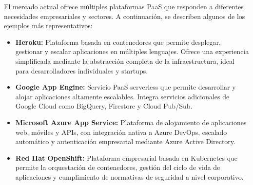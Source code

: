 {            El mercado actual ofrece múltiples plataformas PaaS que responden a diferentes necesidades empresariales y sectores. A continuación, se describen algunos de los ejemplos más representativos:
            
            \begin{itemize}
                \item \textbf{Heroku:} Plataforma basada en contenedores que permite desplegar, gestionar y escalar aplicaciones en múltiples lenguajes. Ofrece una experiencia simplificada mediante la abstracción completa de la infraestructura, ideal para desarrolladores individuales y startups.
                
                \item \textbf{Google App Engine:} Servicio PaaS serverless que permite desarrollar y alojar aplicaciones altamente escalables. Integra servicios adicionales de Google Cloud como BigQuery, Firestore y Cloud Pub/Sub.
                
                \item \textbf{Microsoft Azure App Service:} Plataforma de alojamiento de aplicaciones web, móviles y APIs, con integración nativa a Azure DevOps, escalado automático y autenticación empresarial mediante Azure Active Directory.
                
                \item \textbf{Red Hat OpenShift:} Plataforma empresarial basada en Kubernetes que permite la orquestación de contenedores, gestión del ciclo de vida de aplicaciones y cumplimiento de normativas de seguridad a nivel corporativo.
            \end{itemize}
            
}
